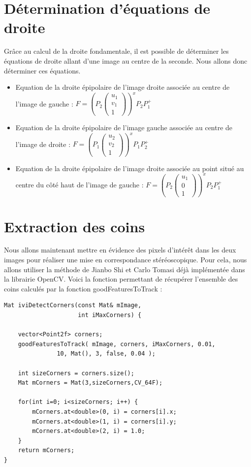 \documentclass[a4paper,10pt]{article}
\begin{document}
\section{Détermination d'équations de droite}
Grâce au calcul de la droite fondamentale, il est possible de déterminer les équations de droite
allant d'une image au centre de la seconde. Nous allons donc déterminer ces équations.
\begin{itemize}
 \item Equation de la droite épipolaire de l'image droite associée au centre de l'image de gauche :
 $F=(P_2\begin{pmatrix}u_1\\v_1\\1\end{pmatrix})^xP_2P^+_1$
 \item Equation de la droite épipolaire de l'image gauche associée au centre de l'image de droite :
 $F=(P_1\begin{pmatrix}u_2\\v_2\\1\end{pmatrix})^xP_1P^+_2$
 \item Equation de la droite épipolaire de l'image droite associée au point situé au centre du côté haut de l'image de gauche :
 $F=(P_2\begin{pmatrix}u_1\\0\\1\end{pmatrix})^xP_2P^+_1$
\end{itemize}

\section{Extraction des coins}
Nous allons maintenant mettre en évidence des pixels d'intérêt dans les deux images pour réaliser une mise
en correspondance stéréoscopique. Pour cela, nous allons utiliser la méthode de Jianbo Shi et Carlo Tomasi\cite{323794}
déjà implémentée dans la librairie OpenCV. Voici la fonction permettant de récupérer l'ensemble des coins calculés
par la fonction goodFeaturesToTrack :
\begin{lstlisting}[caption=Calcul des coins]
 Mat iviDetectCorners(const Mat& mImage,
                     int iMaxCorners) {
                   
    vector<Point2f> corners;
    goodFeaturesToTrack( mImage, corners, iMaxCorners, 0.01,
               10, Mat(), 3, false, 0.04 );

    int sizeCorners = corners.size();
    Mat mCorners = Mat(3,sizeCorners,CV_64F);

    for(int i=0; i<sizeCorners; i++) {
        mCorners.at<double>(0, i) = corners[i].x;
        mCorners.at<double>(1, i) = corners[i].y;
        mCorners.at<double>(2, i) = 1.0;
    }
    return mCorners;
}
\end{lstlisting}
\end{document}
